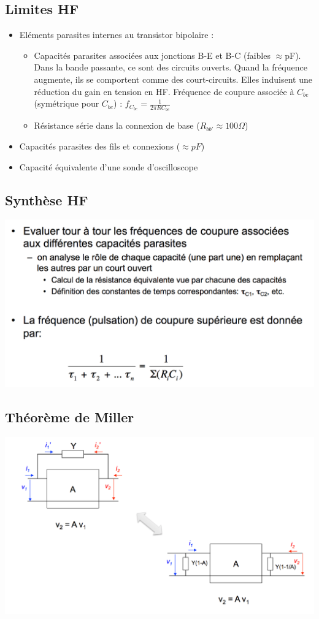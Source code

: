 \documentclass[]{article}
\begin{document}
\subsection{Limites HF}
\begin{itemize}
\item{Eléments parasites internes au transistor bipolaire :}
	\begin{itemize}
	\item{Capacités parasites associées aux jonctions B-E et B-C (faibles $\approx$pF). Dans la bande passante, ce sont des circuits ouverts. Quand la fréquence augmente, ils se comportent comme des court-circuits. Elles induisent une réduction du gain en tension en HF. Fréquence de coupure associée à $C_{be}$ (symétrique pour $C_{bc}$) : $f_{C_{be}} = \frac{1}{2\pi RC_{be}}$   }
	\item{Résistance série dans la connexion de base ($ R_{bb'} \approx 100\Omega $)}
	\end{itemize}
\item{Capacités parasites des fils et connexions ($ \approx pF $)}
\item{Capacité équivalente d'une sonde d'oscilloscope}
\end{itemize}

\subsection{Synthèse HF}
\includegraphics[scale=0.5]{synthhf}

\subsection{Théorème de Miller}
\includegraphics[scale=0.4]{miller}
\end{document}
